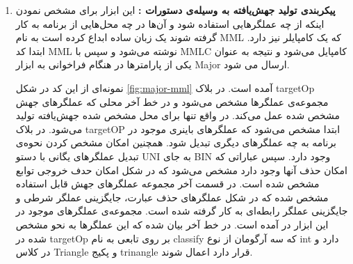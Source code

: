 \begin{enumerate}
\item
\textbf{پیکربندی تولید جهش‌یافته به وسیله‌ی دستورات : }
این ابزار برای مشخص نمودن اینکه از چه عملگرهایی استفاده شود و آن‌ها در چه محل‌هایی از برنامه به کار گرفته شوند یک زبان ساده ابداع کرده است به نام MML که یک کامپایلر نیز دارد. ابتدا کد MML نوشته می‌شود و سپس با MMLC کامپایل می‌شود و نتیجه به عنوان یکی از پارامترها  در هنگام فراخوانی به ابزار  Major ارسال می شود.

نمونه‌ای از این کد در شکل \ref{fig:major-mml} آمده است. در بلاک targetOp مجموعه‌ی عملگرها مشخص می‌شود و در خط آخر محلی که عملگرهای جهش مشخص شده عمل می‌کند. در واقع تنها برای محل مشخص شده جهش‌یافته تولید می‌شود. در بلاک targetOP ابتدا مشخص می‌شود که عملگرهای باینری موجود در برنامه به چه عملگرهای دیگری تبدیل شود. همچنین امکان مشخص کردن نحوه‌ی تبدیل عملگرهای یگانی با دستو UNI به جای BIN وجود دارد. سپس عباراتی که امکان حذف آنها وجود دارد مشخص می‌شود که در شکل امکان حدف خروجی توابع مشخص شده است. در قسمت آخر مجموعه عملگرهای جهش قابل استفاده مشخص شده که در شکل عملگرهای حذف عبارت، جایگزینی عملگر شرطی و جایگزینی عملگر رابطه‌ای به کار گرفته شده است. مجموعه‌ی عملگرهای موجود در این ابزار در \cite{just2014major} آمده است. در خط آخر بیان شده که این عملگرها به نحو مشخص شده در targetOp بر روی تابعی به نام classify که سه آرگومان از نوع int دارد و در کلاس Triangle و پکیج trinangle قرار دارد اعمال شوند.


\end{enumerate}
